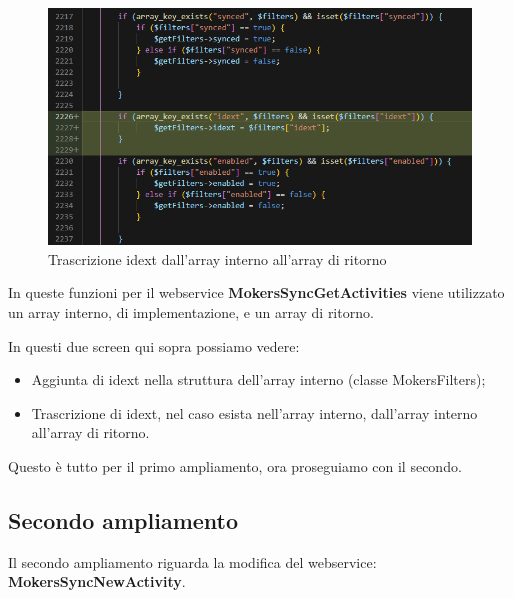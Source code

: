 \begin{figure}[!h] 
	\centering
	\includegraphics[scale = 0.5]{immagini/webservices/ampliamenti/1ampl_mokers_getidext.png}
	\caption{Trascrizione idext dall'array interno all'array di ritorno}
\end{figure}
\newspace
\newspace
\begin{flushleft}
	In queste funzioni per il webservice \textbf{MokersSyncGetActivities} viene utilizzato un array interno, di implementazione, e un array di ritorno.
	
	In questi due screen  qui sopra possiamo vedere:
	\begin{itemize}
		\item Aggiunta di idext nella struttura dell'array interno (classe MokersFilters);
		\item Trascrizione di idext, nel caso esista nell'array interno, dall'array interno all'array di ritorno.
	\end{itemize}
	
	Questo è tutto per il primo ampliamento, ora proseguiamo con il secondo.
\end{flushleft}
\newpage

\subsection{Secondo ampliamento}
Il secondo ampliamento riguarda la modifica del webservice:  \textbf{MokersSyncNewActivity}.

